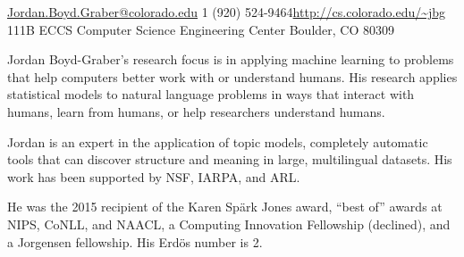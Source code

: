 \documentclass[10pt,a4paper]{article} %
\begin{document}


\noindent\href{mailto:Jordan.Boyd.Graber@colorado.edu}{Jordan.Boyd.Graber@colorado.edu}\bull %
\textsmaller{+}1 (920) 524-9464\bull \href{http://cs.colorado.edu/~jbg}{\url{http://cs.colorado.edu/~jbg}}\\ %
111B ECCS \bull Computer Science \bull Engineering Center \bull Boulder, CO 80309

\spacedhrule{0.9em}{-0.4em} %



\vspace{-1.3em} %

\begin{multicols}{2}  %

Jordan Boyd-Graber's research focus is in applying machine learning
to problems that help computers better
work with or understand humans.  His research
applies statistical models to natural language problems in ways that
interact with humans, learn from humans, or help researchers
understand humans.

Jordan is an expert in the application of topic models, completely automatic
tools that can discover structure and meaning in large, multilingual
datasets. His work has been supported by NSF, IARPA, and ARL.

He was the 2015 recipient of the Karen Sp\"ark Jones award, ``best of'' awards at
NIPS, CoNLL, and NAACL, a Computing Innovation Fellowship (declined), and a
Jorgensen fellowship.  His Erd\"os number is 2.

\end{multicols}

\spacedhrule{0.5em}{-0.4em} %
\end{document}
